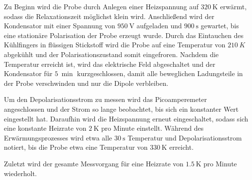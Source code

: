Zu Beginn wird die Probe durch Anlegen einer Heizspannung auf $\SI{320}{\K}$ erwärmt, sodass die 
Relaxationszeit möglichst klein wird.
Anschließend wird der Kondensator mit einer Spannung von $\SI{950}{\V}$ aufgeladen und $\SI{900}{\s}$ gewartet, bis eine stationäre Polarisation der Probe erzeugt wurde.
Durch das Eintauchen des Kühlfingers in flüssigen Stickstoff wird die Probe auf eine Temperatur von $\SI{210}{K}$ abgekühlt und der Polarisationszustand somit eingefroren.
Nachdem die Temperatur erreicht ist, wird das elektrische Feld abgeschaltet und der Kondensator für $\SI{5}{\min}$ kurzgeschlossen, damit alle beweglichen Ladungsteile in der Probe verschwinden und nur die Dipole verbleiben.

Um den Depolarisationsstrom zu messen wird das Picoamperemeter angeschlossen und der Strom so lange beobachtet, bis sich ein konstanter Wert eingestellt hat.
Daraufhin wird die Heizspannung erneut eingeschaltet, sodass sich eine konstante Heizrate von $\SI{2}{\K}$ pro Minute einstellt.
Während des Erwärmungsprozesses wird etwa alle $\SI{30}{\s}$ Temperatur und Depolarisationsstrom notiert, bis die Probe etwa eine Temperatur von $\SI{330}{\K}$ erreicht.

Zuletzt wird der gesamte Messvorgang für eine Heizrate von $\SI{1,5}{\K}$ pro Minute wiederholt.

